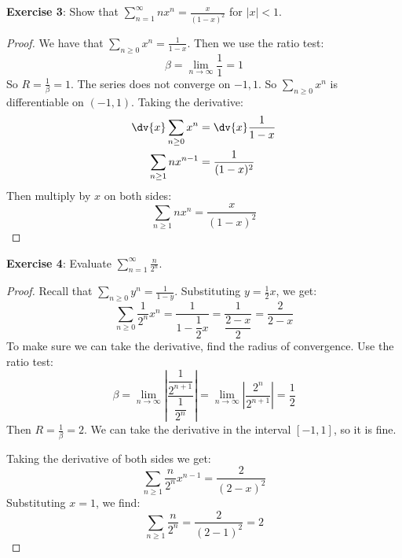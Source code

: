 \documentclass{article}
\begin{document}
\textbf{Exercise 3}: Show that $\sum_{n = 1}^{\infty} nx^{n} = \frac{x}{( 1- x)^{2}}$ for $\lvert x \rvert < 1$. 
    \begin{proof}
        We have that $\sum_{n \geq 0} x^{n} = \frac{1}{1 - x}$. Then we use the ratio test:
            \begin{equation*}
                \beta = \lim\limits_{n \to \infty}\dfrac{1}{1} = 1
            \end{equation*}
        So $R = \frac{1}{\beta} = 1$. The series does not converge on $-1, 1$. So $\sum_{n \geq 0} x^{n}$ is differentiable on $ (-1, 1)$. Taking the derivative:
            \begin{align*}
                \dv{x}\sum_{n \geq 0}x^{n} &= \dv{x}\dfrac{1}{1 - x}  \\
                \sum_{n \geq 1}nx^{n - 1}  &= \dfrac{1}{(1 - x)^{2}}   
            \end{align*}
        Then multiply by $x$ on both sides:
            \begin{equation*}
                \sum_{n \geq 1}nx^{n} = \dfrac{x}{(1 - x)^{2}}
            \end{equation*}
    \end{proof}

\textbf{Exercise 4}: Evaluate $\sum_{n = 1}^{\infty}\frac{n}{2^{n}}$.
    \begin{proof}
        Recall that $\sum_{n \geq 0}y^{n} = \frac{1}{1 - y}$. Substituting $y = \frac{1}{2}x$, we get:
            \begin{equation*}
                \sum_{n \geq 0}\dfrac{1}{2^{n}}x^{n} = \dfrac{1}{1 - \dfrac{1}{2}x} = \dfrac{1}{\dfrac{2 - x}{2}} = \dfrac{2}{2 - x}
            \end{equation*}
        To make sure we can take the derivative, find the radius of convergence. Use the ratio test:
            \begin{equation*}
                \beta = \lim\limits_{n \to \infty} \left\lvert \dfrac{\dfrac{1}{2^{n + 1}}}{\dfrac{1}{2^{n}}} \right\rvert = \lim\limits_{n \to \infty} \left\lvert \dfrac{2^{n}}{2^{n + 1}} \right\rvert = \dfrac{1}{2}
            \end{equation*}
        Then $R = \frac{1}{\beta} = 2$. We can take the derivative in the interval $[-1, 1]$, so it is fine.

        Taking the derivative of both sides we get:
            \begin{equation*}
                \sum_{n \geq 1}\dfrac{n}{2^{n}}x^{n - 1} = \dfrac{2}{(2 - x)^{2}}
            \end{equation*}
        Substituting $x = 1$, we find:
            \begin{equation*}
                \sum_{n \geq 1}\dfrac{n}{2^{n}} = \dfrac{2}{(2 - 1)^{2}} = 2
            \end{equation*}

    \end{proof}
\end{document}

